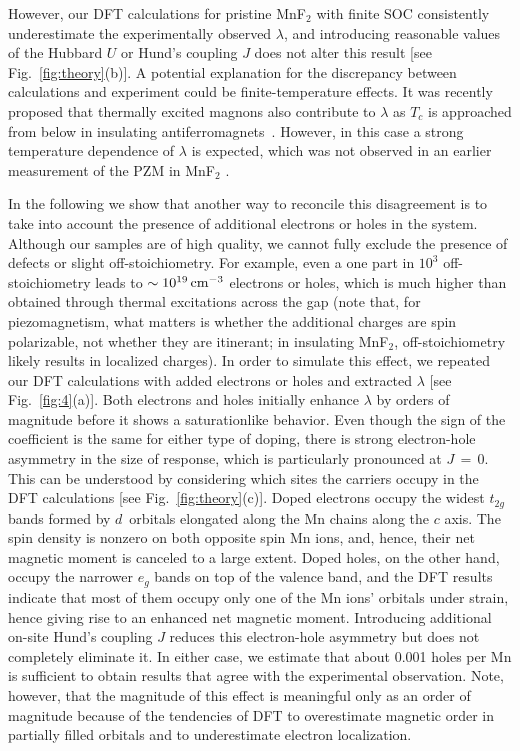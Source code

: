 \documentclass[
 reprint,










 amsmath,amssymb,
 aps,






]{revtex4-2}
\begin{document}
 However, our DFT calculations for pristine MnF$_2$ with finite SOC consistently underestimate the experimentally observed $\lambda$, and introducing reasonable values of the Hubbard $U$ or Hund’s coupling $J$ does not alter this result [see Fig.~\ref{fig:theory}(b)]. A potential explanation for the discrepancy between calculations and experiment could be finite-temperature effects. It was recently proposed that thermally excited magnons also contribute to $\lambda$ as $T_c$ is approached from below in insulating antiferromagnets~\cite{Yershov24,Khodas25}.  However, in this case a strong temperature dependence of $\lambda$ is expected, which was not observed in an earlier measurement of the PZM in MnF$_2$ \cite{Bar19}.

In the following we show that another way to reconcile this disagreement is to take into account the presence of additional electrons or holes in the system. Although our samples are of high quality, we cannot fully exclude the presence of defects or slight off-stoichiometry. For example, even a one part in $10^3$ off-stoichiometry leads to $\sim 10^{19}\,{\rm cm}^{-3}$ electrons or holes, which is much higher than obtained through thermal excitations across the gap (note that, for piezomagnetism, what matters is whether the additional charges are spin polarizable, not whether they are itinerant; in insulating MnF$_2$, off-stoichiometry likely results in localized charges). In order to simulate this effect, we repeated our DFT calculations with added electrons or holes and extracted $\lambda$ [see Fig.~\ref{fig:4}(a)]. Both electrons and holes initially enhance $\lambda$ by orders of magnitude before it shows a saturationlike behavior.  Even though the sign of the coefficient is the same for either type of doping, there is strong electron-hole asymmetry in the size of response, which is particularly pronounced at $J\,=\,0$. This can be understood by considering which sites the carriers occupy in the DFT calculations [see Fig.~\ref{fig:theory}(c)]. Doped electrons occupy the widest $t_{2g}$ bands formed by $d$~orbitals elongated along the Mn chains along the $c$ axis. The spin density is nonzero on both opposite spin Mn ions, and, hence, their net magnetic moment is canceled to a large extent. Doped holes, on the other hand, occupy the narrower $e_g$ bands on top of the valence band, and the DFT results indicate that most of them occupy only one of the Mn ions' orbitals under strain, hence giving rise to an enhanced net magnetic moment. Introducing additional on-site Hund's coupling $J$ reduces this electron-hole asymmetry but does not completely eliminate it. In either case, we estimate that about 0.001 holes per Mn is sufficient to obtain results that agree with the experimental observation. Note, however, that the magnitude of this effect is meaningful only as an order of magnitude because of the tendencies of DFT to overestimate magnetic order in partially filled orbitals and to underestimate electron localization.
\end{document}
